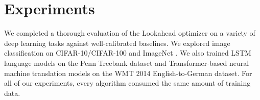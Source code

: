\section{Experiments}
\label{sec:experiments}

We completed a thorough evaluation of the Lookahead optimizer on a variety of deep learning tasks against well-calibrated baselines. We explored image classification on CIFAR-10/CIFAR-100 \citep{krizhevsky2009learning} and ImageNet \citep{deng2009imagenet}. We also trained LSTM language models on the Penn Treebank dataset \citep{marcus1993building} and Transformer-based \citep{vaswani2017attention} neural machine translation models on the WMT 2014 English-to-German dataset. For all of our experiments, every algorithm consumed the same amount of training data. 







% 
